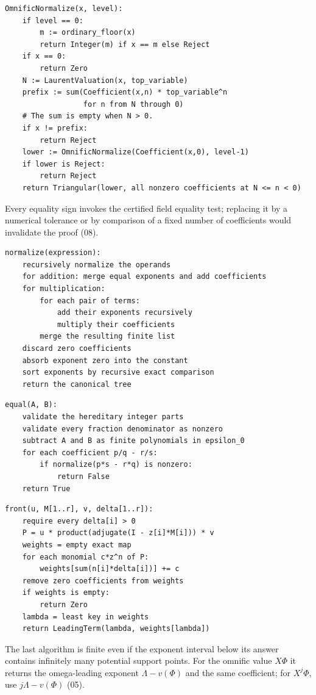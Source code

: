 \documentclass[11pt,oneside]{article}
\numberwithin{equation}{section}
\theoremstyle{definition}
\theoremstyle{remark}
\begin{document}
\begin{lstlisting}[caption={Field-to-integer conversion in the towers (08).},label={onot:lst:normalize}]
OmnificNormalize(x, level):
    if level == 0:
        m := ordinary_floor(x)
        return Integer(m) if x == m else Reject
    if x == 0:
        return Zero
    N := LaurentValuation(x, top_variable)
    prefix := sum(Coefficient(x,n) * top_variable^n
                  for n from N through 0)
    # The sum is empty when N > 0.
    if x != prefix:
        return Reject
    lower := OmnificNormalize(Coefficient(x,0), level-1)
    if lower is Reject:
        return Reject
    return Triangular(lower, all nonzero coefficients at N <= n < 0)
\end{lstlisting}
Every equality sign invokes the certified field equality test; replacing it by a
numerical tolerance or by comparison of a fixed number of coefficients would
invalidate the proof (08).

\begin{lstlisting}[caption={Hereditary finite normalization (05).},label={onot:lst:hereditary}]
normalize(expression):
    recursively normalize the operands
    for addition: merge equal exponents and add coefficients
    for multiplication:
        for each pair of terms:
            add their exponents recursively
            multiply their coefficients
        merge the resulting finite list
    discard zero coefficients
    absorb exponent zero into the constant
    sort exponents by recursive exact comparison
    return the canonical tree
\end{lstlisting}

\begin{lstlisting}[caption={Equality in the $\varepsilon_0$-shielded calculus (05).},label={onot:lst:epsilon}]
equal(A, B):
    validate the hereditary integer parts
    validate every fraction denominator as nonzero
    subtract A and B as finite polynomials in epsilon_0
    for each coefficient p/q - r/s:
        if normalize(p*s - r*q) is nonzero:
            return False
    return True
\end{lstlisting}

\begin{lstlisting}[caption={Collision-aware leading term of a matrix series (05).},label={onot:lst:front}]
front(u, M[1..r], v, delta[1..r]):
    require every delta[i] > 0
    P = u * product(adjugate(I - z[i]*M[i])) * v
    weights = empty exact map
    for each monomial c*z^n of P:
        weights[sum(n[i]*delta[i])] += c
    remove zero coefficients from weights
    if weights is empty:
        return Zero
    lambda = least key in weights
    return LeadingTerm(lambda, weights[lambda])
\end{lstlisting}
The last algorithm is finite even if the exponent interval below its answer
contains infinitely many potential support points. For the omnific value $X\Phi$
it returns the omega-leading exponent $\Lambda-v(\Phi)$ and the same coefficient;
for $X^j\Phi$, use $j\Lambda-v(\Phi)$ (05).
\end{document}
